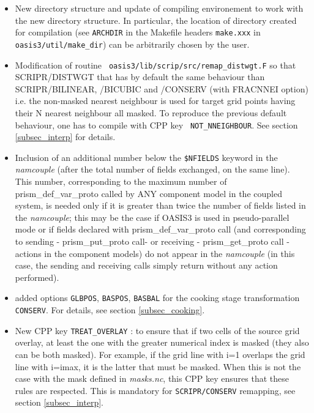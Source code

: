 \begin{itemize}
\begin{itemize}
  \item New directory structure and update of compiling environement
    to work with the new directory structure. In particular, the
    location of directory created for compilation (see {\tt ARCHDIR}
    in the Makefile headers {\tt make.xxx} in {\tt
      oasis3/util/make\_dir}) can be arbitrarily chosen by the user.

  \item Modification of routine {\tt
      oasis3/lib/scrip/src/remap\_distwgt.F} so that \newline SCRIPR/DISTWGT
    that has by default the same behaviour than SCRIPR/BILINEAR,
    /BICUBIC and /CONSERV (with FRACNNEI option) i.e. the non-masked
    nearest neighbour is used for target grid points having their N
    nearest neighbour all masked. To reproduce the previous default
    behaviour, one has to compile with CPP key {\tt
      NOT\_NNEIGHBOUR}. See section \ref{subsec_interp} for details.

  \item Inclusion of an additional number below the {\tt \$NFIELDS}
    keyword in the {\it namcouple} (after the total number of fields
    exchanged, on the same line). This number, corresponding to the
    maximum number of prism\_def\_var\_proto called by ANY component
    model in the coupled system, is needed only if it is greater than
    twice the number of fields listed in the {\it namcouple}; this may
    be the case if OASIS3 is used in pseudo-parallel mode or if fields
    declared with prism\_def\_var\_proto call (and corresponding to
    sending - prism\_put\_proto call- or receiving - prism\_get\_proto
    call - actions in the component models) do not appear in the {\it
      namcouple} (in this case, the sending and receiving calls simply
    return without any action performed).

   \item added options {\tt GLBPOS}, {\tt BASPOS}, {\tt BASBAL} for the 
  cooking stage transformation {\tt CONSERV}. For details, see section
      \ref{subsec_cooking}.
  
   \item New CPP key {\tt TREAT\_OVERLAY} : to ensure that if two cells
    of the source grid overlay, at least the one with the greater
    numerical index is masked (they also can be both masked).  For
    example, if the grid line with i=1 overlaps the grid line with
    i=imax, it is the latter that must be masked. When this
    is not the case with the mask defined in {\it masks.nc}, this CPP key 
    ensures that these rules are respected. This is mandatory
    for {\tt SCRIPR/CONSERV} remapping, see section \ref{subsec_interp}.


\end{itemize}
\end{itemize}
